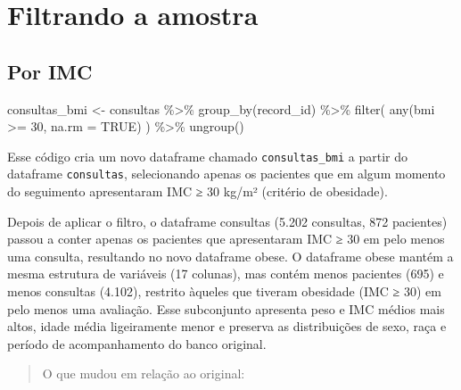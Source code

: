 \documentclass[
]{article}
\newenvironment{Shaded}{\begin{snugshade}}{\end{snugshade}}
\newcommand{\AttributeTok}[1]{\textcolor[rgb]{0.40,0.45,0.13}{#1}}
\newcommand{\ConstantTok}[1]{\textcolor[rgb]{0.56,0.35,0.01}{#1}}
\newcommand{\DecValTok}[1]{\textcolor[rgb]{0.68,0.00,0.00}{#1}}
\newcommand{\FunctionTok}[1]{\textcolor[rgb]{0.28,0.35,0.67}{#1}}
\newcommand{\NormalTok}[1]{\textcolor[rgb]{0.00,0.23,0.31}{#1}}
\newcommand{\OtherTok}[1]{\textcolor[rgb]{0.00,0.23,0.31}{#1}}
\newcommand{\SpecialCharTok}[1]{\textcolor[rgb]{0.37,0.37,0.37}{#1}}
\begin{document}
\section{Filtrando a amostra}\label{filtrando-a-amostra}

\subsection{Por IMC}\label{por-imc}

\begin{Shaded}
\begin{Highlighting}[]
\NormalTok{consultas\_bmi }\OtherTok{\textless{}{-}}\NormalTok{ consultas }\SpecialCharTok{\%\textgreater{}\%}
  \FunctionTok{group\_by}\NormalTok{(record\_id) }\SpecialCharTok{\%\textgreater{}\%}
  \FunctionTok{filter}\NormalTok{(}
    \FunctionTok{any}\NormalTok{(bmi }\SpecialCharTok{\textgreater{}=} \DecValTok{30}\NormalTok{, }\AttributeTok{na.rm =} \ConstantTok{TRUE}\NormalTok{)}
\NormalTok{  ) }\SpecialCharTok{\%\textgreater{}\%} 
  \FunctionTok{ungroup}\NormalTok{()}
\end{Highlighting}
\end{Shaded}

Esse código cria um novo dataframe chamado \texttt{consultas\_bmi} a
partir do dataframe \texttt{consultas}, selecionando apenas os pacientes
que em algum momento do seguimento apresentaram IMC ≥ 30 kg/m² (critério
de obesidade).

Depois de aplicar o filtro, o dataframe consultas (5.202 consultas, 872
pacientes) passou a conter apenas os pacientes que apresentaram IMC ≥ 30
em pelo menos uma consulta, resultando no novo dataframe obese. O
dataframe obese mantém a mesma estrutura de variáveis (17 colunas), mas
contém menos pacientes (695) e menos consultas (4.102), restrito àqueles
que tiveram obesidade (IMC ≥ 30) em pelo menos uma avaliação. Esse
subconjunto apresenta peso e IMC médios mais altos, idade média
ligeiramente menor e preserva as distribuições de sexo, raça e período
de acompanhamento do banco original.

\begin{quote}
O que mudou em relação ao original:
\end{quote}
\end{document}
